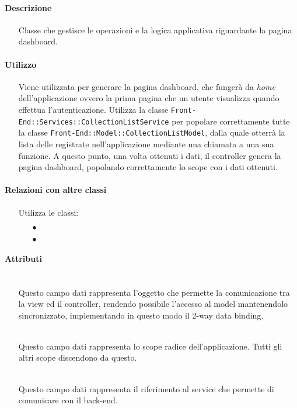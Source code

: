 \paragraph*{Descrizione}
\begin{itemize}
\item[] Classe che gestisce le operazioni e la logica applicativa riguardante la pagina dashboard.
\end{itemize}

\paragraph*{Utilizzo}
\begin{itemize}
\item[] Viene utilizzata per generare la pagina dashboard, che fungerà da \textit{home} dell'applicazione ovvero la prima pagina che un utente visualizza quando effettua l'autenticazione. Utilizza la classe \texttt{Front-End::Services::CollectionListService} per popolare correttamente tutte la classe \texttt{Front-End::Model::CollectionListModel}, dalla quale otterrà la lista delle  registrate nell'applicazione mediante una chiamata a una sua funzione. A questo punto, una volta ottenuti i dati, il controller genera la pagina dashboard, popolando correttamente lo scope con i dati ottenuti.
\end{itemize}

\paragraph*{Relazioni con altre classi}
\begin{itemize}


\item[] Utilizza le classi:
\begin{itemize}
\item[$\bullet$] 
\item[$\bullet$] 
\end{itemize}
\end{itemize}

\paragraph*{Attributi}
\begin{itemize}
\item[]  \\ Questo campo dati rappresenta l'oggetto che permette la comunicazione tra la view ed il controller, rendendo possibile l’accesso al model mantenendolo sincronizzato, implementando in questo modo il 2-way data binding.
\item[]  \\ Questo campo dati rappresenta lo scope radice dell'applicazione. Tutti gli altri scope discendono da questo.
\item[]  \\ Questo campo dati rappresenta il riferimento al service che permette di comunicare con il back-end.
\end{itemize}


